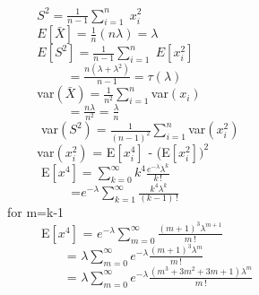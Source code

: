 \documentclass[]{article}
\begin{document}
$\hspace{1cm}S^{2}=\frac{1}{n-1}\sum_{i=1}^{n} \;x_{i}^{2}$\\

$\hspace{1cm}E[\bar{X}] = \frac{1}{n}(n\lambda) = \lambda$\\

$\hspace{1cm}E[S^{2}] = \frac{1}{n-1}\sum_{i=1}^{n} \;E[x_{i}^{2}]$\\

$\hspace{2cm}=\frac{n(\lambda+\lambda^{2})}{n-1} = \tau(\lambda)$\\

$\hspace{1cm}$var$(\bar{X})= \frac{1}{n^{2}}
\sum_{i=1}^{n} $var$(x_{i})$\\

$\hspace{2cm} = \frac{n\lambda}{n^{2}} = \frac{\lambda}{n}$\\

$\hspace{1cm}$ var$(S^{2}) = \frac{1}{(n-1)^{2}} \sum_{i=1}^{n} $var$(x_{i}^{2})$\\

$\hspace{1cm}$var$(x_{i}^{2})$ = E$[x_{i}^{4}]$ - (E$[x_{i}^{2}])^{2}$\\

$\hspace{1cm}$ E$[x^{4}] = \sum_{k=0}^{\infty} k^{4} \frac{e^{-\lambda}\lambda^{k}}{k\,!}$\\

$\hspace{2cm}$ =$ e^{-\lambda}\sum_{k=1}^{\infty} \frac{k^{4}\lambda^{k}}{(k-1)\,!}$\\

for m=k-1\\
 
$\hspace{1cm}$ E$[x^{4}]$ = $e^{-\lambda}\sum_{m=0}^{\infty} \frac{(m+1)^{3}\lambda^{m+1}}{m\,!}$ \\
 
 
$ \hspace{2cm} $= $\lambda\sum_{m=0}^{\infty} e^{-\lambda}\frac{(m+1)^{3}\lambda^{m}}{m\,!}$ \\
 
$ \hspace{2cm} $= $\lambda\sum_{m=0}^{\infty} e^{-\lambda}\frac{(m^{3}+3m^{2}+3m+1)\lambda^{m}}{m\,!}$ \\
 
\end{document}

